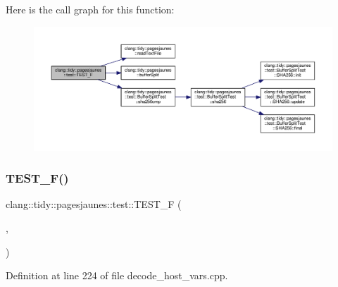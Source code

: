 Here is the call graph for this function\+:
\nopagebreak
\begin{figure}[H]
\begin{center}
\leavevmode
\includegraphics[width=350pt]{namespaceclang_1_1tidy_1_1pagesjaunes_1_1test_ad1f201f476aa94ca49f994481cb11c99_cgraph}
\end{center}
\end{figure}
\mbox{\label{namespaceclang_1_1tidy_1_1pagesjaunes_1_1test_a54aa96058cd21d48458c5b07b5d256f6}} 
\subsubsection{\texorpdfstring{T\+E\+S\+T\+\_\+\+F()}{TEST\_F()}\hspace{0.1cm}{\footnotesize\ttfamily [49/57]}}
{\footnotesize\ttfamily clang\+::tidy\+::pagesjaunes\+::test\+::\+T\+E\+S\+T\+\_\+F (\begin{DoxyParamCaption}\item[{\hyperlink{classclang_1_1tidy_1_1pagesjaunes_1_1test_1_1_decode_host_vars_test}{Decode\+Host\+Vars\+Test}}]{,  }\item[{Decode\+Host\+Vars\+Pointers}]{ }\end{DoxyParamCaption})}



Definition at line 224 of file decode\+\_\+host\+\_\+vars.\+cpp.

